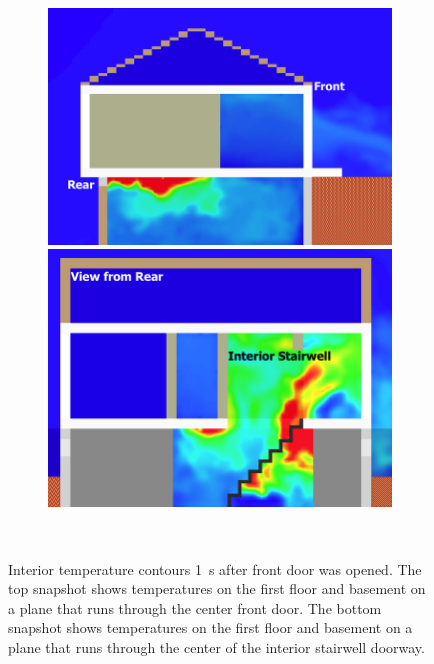 \documentclass[12pt,oneside]{book}
\begin{document}
\begin{figure}[!ht]
\begin{subfigure}{0.65\textwidth}
\includegraphics[trim = 0in 0in 0in 0in, clip=true, width=\textwidth]{../Figures/side_view_101s} \\
\vskip4pt
\includegraphics[trim = 0in 0in 0in 0in, clip=true, width=\textwidth]{../Figures/stair_view_101s} 
\end{subfigure}
\begin{subfigure}{0.35\textwidth}

 \\
\end{subfigure}
\caption[Interior temperature contours 1~s after front door was opened]
{Interior temperature contours 1~s after front door was opened. The top snapshot shows temperatures on the first floor and basement on a plane that runs through the center front door. The bottom snapshot shows temperatures on the first floor and basement on a plane that runs through the center of the interior stairwell doorway.}
\label{fig:int_temp_101s}
\end{figure}
\end{document}
